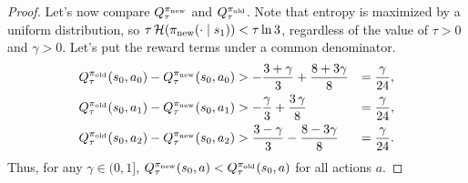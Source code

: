 \documentclass[\main/thesis.tex]{subfiles}
\begin{document}
\begin{proof}
Let's now compare $Q_\tau^{\pi_\mathrm{new}}$ and $Q_\tau^{\pi_\mathrm{old}}$. Note that entropy is maximized by a uniform distribution, so $\tau \,\mathcal{H}({\pi_\mathrm{new}}(\cdot \mid s_1)) < \tau \ln 3$, regardless of the value of $\tau > 0$ and $\gamma > 0$. Let's put the reward terms under a common denominator. 
\begin{align*}
    Q^{\pi_\mathrm{old}}_\tau(s_0, a_0) - Q^{\pi_\mathrm{new}}_\tau(s_0, a_0) &> - \frac{3 + \gamma}{3} + \frac{8 + 3 \gamma}{8} &= \frac{\gamma}{24},\\
    Q^{\pi_\mathrm{old}}_\tau(s_0, a_1) - Q^{\pi_\mathrm{new}}_\tau(s_0, a_1) &> - \frac{\gamma}{3} + \frac{3\, \gamma }{8}  &= \frac{\gamma}{24},\\
    Q^{\pi_\mathrm{old}}_\tau(s_0, a_2) - Q^{\pi_\mathrm{new}}_\tau(s_0, a_2) &> \frac{3 - \gamma}{3} - \frac{8 - 3 \gamma}{8} &= \frac{\gamma}{24}.
\end{align*}
Thus, for any $\gamma \in (0, 1]$, $Q_\tau^{\pi_\mathrm{new}}(s_0, a) < Q_\tau^{\pi_\mathrm{old}}(s_0, a)$ for all actions $a$. 


\end{proof}
\end{document}

